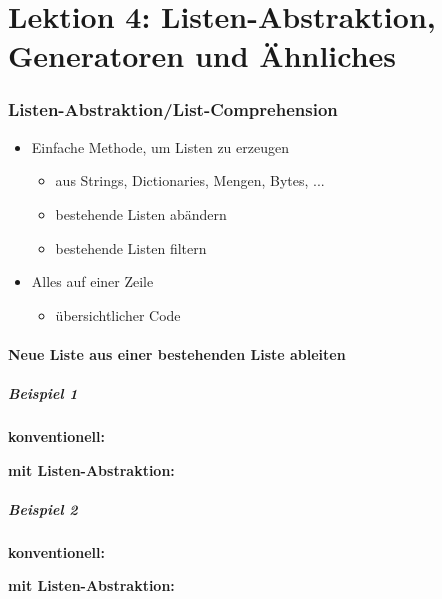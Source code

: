 \part*{Lektion 4: Listen-Abstraktion, Generatoren und Ähnliches}

\section{Listen-Abstraktion/List-Comprehension}
\begin{itemize}
	\item Einfache Methode, um Listen zu erzeugen
	\begin{itemize}
		\item aus Strings, Dictionaries, Mengen, Bytes, ...
		\item bestehende Listen abändern
		\item bestehende Listen filtern
	\end{itemize}
	\item Alles auf einer Zeile
	\begin{itemize}
		\item übersichtlicher Code
	\end{itemize}
\end{itemize}

\subsection{Neue Liste aus einer bestehenden Liste ableiten}

\subsubsection{Beispiel 1}
\begin{multicols}{2}
	\textbf{konventionell:}
	
	\vfill\null
	\columnbreak
	\textbf{mit Listen-Abstraktion:}
	
	\vfill\null
\end{multicols}

\subsubsection{Beispiel 2}
\begin{multicols}{2}
	\textbf{konventionell:}
	
	\vfill\null
	\textbf{mit Listen-Abstraktion:}
	
	\vfill\null
\end{multicols}

